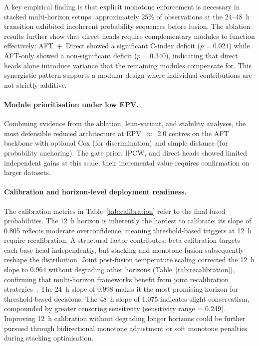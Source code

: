 \documentclass[fire,article,submit,pdftex]{../Definitions/mdpi}
\begin{document}
A key empirical finding is that explicit monotone enforcement is necessary in stacked multi-horizon setups: approximately 25\% of observations at the 24--48~h transition exhibited incoherent probability sequences before fusion.
The ablation results further show that direct heads require complementary modules to function effectively: AFT~+~Direct showed a significant C-index deficit ($p = 0.024$) while AFT-only showed a non-significant deficit ($p = 0.340$), indicating that direct heads alone introduce variance that the remaining modules compensate for.
This synergistic pattern supports a modular design where individual contributions are not strictly additive.

\paragraph{Module prioritisation under low EPV.}
Combining evidence from the ablation, lean-variant, and stability analyses, the most defensible reduced architecture at EPV~$\approx$~2.0 centres on the AFT backbone with optional Cox (for discrimination) and simple distance (for probability anchoring).
The gate prior, IPCW, and direct heads showed limited independent gains at this scale; their incremental value requires confirmation on larger datasets.

\paragraph{Calibration and horizon-level deployment readiness.}
The calibration metrics in Table~\ref{tab:calibration} refer to the final fused probabilities.
The 12~h horizon is inherently the hardest to calibrate; its slope of 0.805 reflects moderate overconfidence, meaning threshold-based triggers at 12~h require recalibration.
A structural factor contributes: beta calibration targets each base head independently, but stacking and monotone fusion subsequently reshape the distribution.
Joint post-fusion temperature scaling corrected the 12~h slope to 0.964 without degrading other horizons (Table~\ref{tab:recalibration}), confirming that multi-horizon frameworks benefit from joint recalibration strategies~\cite{NiculescuMizil2005}.
The 24~h slope of 0.998 makes it the most promising horizon for threshold-based decisions.
The 48~h slope of 1.075 indicates slight conservatism, compounded by greater censoring sensitivity (sensitivity range = 0.249).
Improving 12~h calibration without degrading longer horizons could be further pursued through bidirectional monotone adjustment or soft monotone penalties during stacking optimisation.
\end{document}

